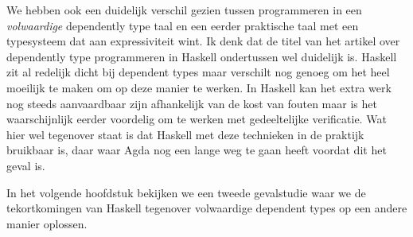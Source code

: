 We hebben ook een duidelijk verschil gezien tussen programmeren in een
\emph{volwaardige} dependently type taal en een eerder praktische taal met een
typesysteem dat aan expressiviteit wint. Ik denk dat de titel van het artikel
over dependently type programmeren in Haskell ondertussen wel duidelijk is.
Haskell zit al redelijk dicht bij dependent types maar verschilt nog genoeg om
het heel moeilijk te maken om op deze manier te werken. In Haskell kan het
extra werk nog steeds aanvaardbaar zijn afhankelijk van de kost van fouten maar
is het waarschijnlijk eerder voordelig om te werken met gedeeltelijke
verificatie. Wat hier wel tegenover staat is dat Haskell met deze technieken in
de praktijk bruikbaar is, daar waar Agda nog een lange weg te gaan heeft
voordat dit het geval is.

In het volgende hoofdstuk bekijken we een tweede gevalstudie waar we de
tekortkomingen van Haskell tegenover volwaardige dependent types op een andere
manier oplossen.

